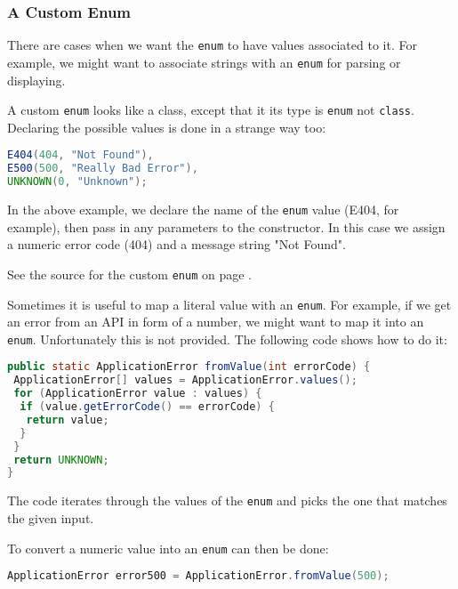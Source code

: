 \subsubsection{A Custom Enum}
There are cases when we want the \lstinline[columns=fixed]{enum} to have values associated to it. For example, we might want to associate strings with an \lstinline[columns=fixed]{enum} for parsing or displaying.

A custom \lstinline[columns=fixed]{enum} looks like a class, except that it its type is \lstinline[columns=fixed]{enum} not \lstinline[columns=fixed]{class}. Declaring the possible values is done in a strange way too:
\begin{lstlisting}[language=Java]
E404(404, "Not Found"),
E500(500, "Really Bad Error"),
UNKNOWN(0, "Unknown");
\end{lstlisting}
In the above example, we declare the name of the \lstinline[columns=fixed]{enum} value (E404, for example), then pass in any parameters to the constructor. In this case we assign a numeric error code (404) and a message string "Not Found".

See the source for the custom \lstinline[columns=fixed]{enum} on page \pageref{App:AppendixISpecialEnum}.

Sometimes it is useful to map a literal value with an \lstinline[columns=fixed]{enum}. For example, if we get an error from an API in form of a number, we might want to map it into an \lstinline[columns=fixed]{enum}. Unfortunately this is not provided. The following code shows how to do it:
\begin{lstlisting}[language=Java]
public static ApplicationError fromValue(int errorCode) {
 ApplicationError[] values = ApplicationError.values();
 for (ApplicationError value : values) {
  if (value.getErrorCode() == errorCode) {
   return value;
  }
 }
 return UNKNOWN;
}
\end{lstlisting}
The code iterates through the values of the \lstinline[columns=fixed]{enum} and picks the one that matches the given input.

To convert a numeric value into an \lstinline[columns=fixed]{enum} can then be done:
\begin{lstlisting}[language=Java]
ApplicationError error500 = ApplicationError.fromValue(500);
\end{lstlisting}

